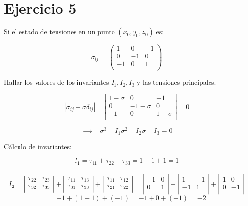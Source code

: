 \documentclass[a4paper,12pt,twoside,final,spanish]{article}
\begin{document}
\section*{Ejercicio 5}

Si el estado de tensiones en un punto $(x_{0},y_{0},z_{0})$ es:

\[
\sigma_{ij}=
\left(\begin{matrix}
1 & 0 & -1\\
0 & -1 & 0\\
-1 & 0 & 1\\
\end{matrix}\right)
\]

Hallar los valores de los invariantes $I_{1},I_{2},I_{3}$ y las tensiones principales.

\dotfill

\[
|\sigma_{ij}-\sigma\delta_{ij}|=
\left|\begin{matrix}
1-\sigma & 0 & -1 \\
0 & -1-\sigma & 0 \\
-1 & 0 & 1-\sigma \\
\end{matrix}\right|=0
\]

\[
\implies -\sigma^{3}+I_{1}\sigma^{2}-I_{2}\sigma+I_{3}=0
\]

Cálculo de invariantes:

\[
I_{1}=\tau_{11}+\tau_{22}+\tau_{33}
=1-1+1=1
\]\\

\[
I_{2}=
\left|\begin{matrix}
\tau_{22} & \tau_{23} \\
\tau_{32} & \tau_{33} \\
\end{matrix}\right|
+
\left|\begin{matrix}
\tau_{11} & \tau_{13} \\
\tau_{31} & \tau_{33} \\
\end{matrix}\right|
+
\left|\begin{matrix}
\tau_{11} & \tau_{12} \\
\tau_{21} & \tau_{22} \\
\end{matrix}\right|
=
\left|\begin{matrix}
-1 & 0 \\
0 & 1 \\
\end{matrix}\right|
+
\left|\begin{matrix}
1 & -1 \\
-1 & 1 \\
\end{matrix}\right|
+
\left|\begin{matrix}
1 & 0 \\
0 & -1 \\
\end{matrix}\right|
\]
\[
=-1+(1-1)+(-1)=-1+0+(-1)=-2
\]\\
\end{document}
